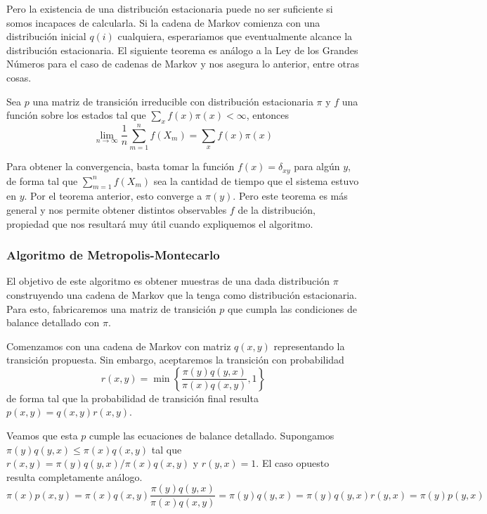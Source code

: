 Pero la existencia de una distribución estacionaria puede no ser suficiente si somos incapaces de calcularla.
Si la cadena de Markov comienza con una distribución inicial $q(i)$ cualquiera, esperariamos que eventualmente alcance la distribución estacionaria.
El siguiente teorema es análogo a la Ley de los Grandes Números para el caso de cadenas de Markov y nos asegura lo anterior, entre otras cosas.

\begin{theorem}{\label{teo:markov_muestreo}}
 Sea $p$ una matriz de transición irreducible con distribución estacionaria $\pi$ y $f$ una función sobre los estados tal que $\sum_x f(x)\pi(x) < \infty$, entonces
 \[ \lim_{n\to\infty} \frac{1}{n} \sum_{m=1}^n f(X_m) = \sum_x f(x)\pi(x) \]
\end{theorem}

Para obtener la convergencia, basta tomar la función $f(x) = \delta_{xy}$ para algún $y$, de forma tal que $\sum_{m=1}^n f(X_m)$ sea la cantidad de tiempo que el sistema estuvo en $y$.
Por el teorema anterior, esto converge a $\pi(y)$.
Pero este teorema es más general y nos permite obtener distintos observables $f$ de la distribución, propiedad que nos resultará muy útil cuando expliquemos el algoritmo.


\subsubsection{Algoritmo de Metropolis-Montecarlo}{\label{sec:alg_mm}}

El objetivo de este algoritmo es obtener muestras de una dada distribución $\pi$ construyendo una cadena de Markov que la tenga como distribución estacionaria.
Para esto, fabricaremos una matriz de transición $p$ que cumpla las condiciones de balance detallado con $\pi$.

Comenzamos con una cadena de Markov con matriz $q(x,y)$ representando la transición propuesta.
Sin embargo, aceptaremos la transición con probabilidad
\[r(x,y) = \min \left\{ \frac{\pi(y)q(y,x)}{\pi(x)q(x,y)}, 1\right\}\]
de forma tal que la probabilidad de transición final resulta $p(x,y) = q(x,y)r(x,y)$.

Veamos que esta $p$ cumple las ecuaciones de balance detallado.
Supongamos $\pi(y)q(y,x) \leq \pi(x)q(x,y)$ tal que $r(x,y) = \pi(y)q(y,x)/\pi(x)q(x,y)$ y $r(y,x) = 1$.
El caso opuesto resulta completamente análogo.
\[ \pi(x) p(x, y) = \pi(x) q(x,y)\frac{\pi(y)q(y,x)}{\pi(x)q(x,y)} = \pi(y)q(y,x) = \pi(y)q(y,x)r(y,x) = \pi(y)p(y,x) \]

